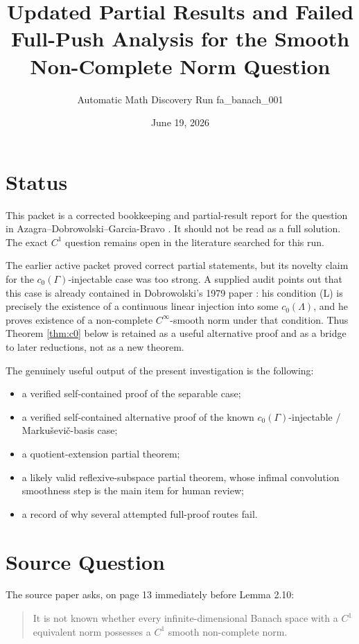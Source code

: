 \documentclass[11pt]{article}
\title{Updated Partial Results and Failed Full-Push Analysis for the Smooth Non-Complete Norm Question}
\author{Automatic Math Discovery Run fa\_banach\_001}
\date{June 19, 2026}
\theoremstyle{remark}
\begin{document}
\maketitle

\section*{Status}

This packet is a corrected bookkeeping and partial-result report for the
question in Azagra--Dobrowolski--Garcia-Bravo \cite{ADG}.  It should not be
read as a full solution.  The exact \(C^1\) question remains open in the
literature searched for this run.

The earlier active packet proved correct partial statements, but its novelty
claim for the \(c_0(\Gamma)\)-injectable case was too strong.  A supplied
audit points out that this case is already contained in Dobrowolski's 1979
paper \cite[Proposition 5.1]{Dobrowolski1979}: his condition (L) is precisely
the existence of a continuous linear injection into some \(c_0(\Lambda)\), and
he proves existence of a non-complete \(C^\infty\)-smooth norm under that
condition.  Thus Theorem \ref{thm:c0} below is retained as a useful
alternative proof and as a bridge to later reductions, not as a new theorem.

The genuinely useful output of the present investigation is the following:

\begin{itemize}
\item a verified self-contained proof of the separable case;
\item a verified self-contained alternative proof of the known
\(c_0(\Gamma)\)-injectable / Marku\v{s}evi\v{c}-basis case;
\item a quotient-extension partial theorem;
\item a likely valid reflexive-subspace partial theorem, whose infimal
convolution smoothness step is the main item for human review;
\item a record of why several attempted full-proof routes fail.
\end{itemize}

\section*{Source Question}

The source paper asks, on page 13 immediately before Lemma 2.10:

\begin{quote}
It is not known whether every infinite-dimensional Banach space with a
\(C^1\) equivalent norm possesses a \(C^1\) smooth non-complete norm.
\end{quote}
\end{document}
